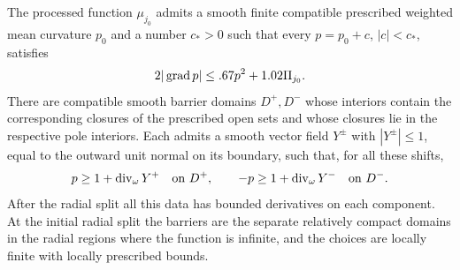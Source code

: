 \begin{lemma}\label{cut:prescribed-curvature}
The processed function $\mu_{j_0}$ admits a smooth finite compatible
prescribed weighted mean curvature $p_0$ and a number $c_*>0$
such that every $p=p_0+c$, $|c|<c_*$, satisfies
\begin{equation}\label{cut:prescribed-curvature-gradient}
             2|\operatorname{grad} p|\le .67p^2+1.02\Pi_{j_0}.
\end{equation}
There are compatible smooth barrier domains $D^+,D^-$ whose interiors
contain the corresponding closures of the prescribed open sets and whose closures lie in
the respective pole interiors.  Each admits a smooth vector field $Y^\pm$
with $|Y^\pm|\le1$, equal to the outward unit normal on its boundary, such
that, for all these shifts,
\begin{equation}\label{cut:barrier-curvature}
 p\ge1+\operatorname{div}_\omega Y^+\quad\hbox{on }D^+,
 \qquad
 -p\ge1+\operatorname{div}_\omega Y^-\quad\hbox{on }D^-.
\end{equation}
After the radial split all this data has bounded derivatives on each component.
At the initial radial split the barriers are the separate relatively
compact domains in the radial regions where the function is infinite, and the choices are locally
finite with locally prescribed bounds.
\end{lemma}

